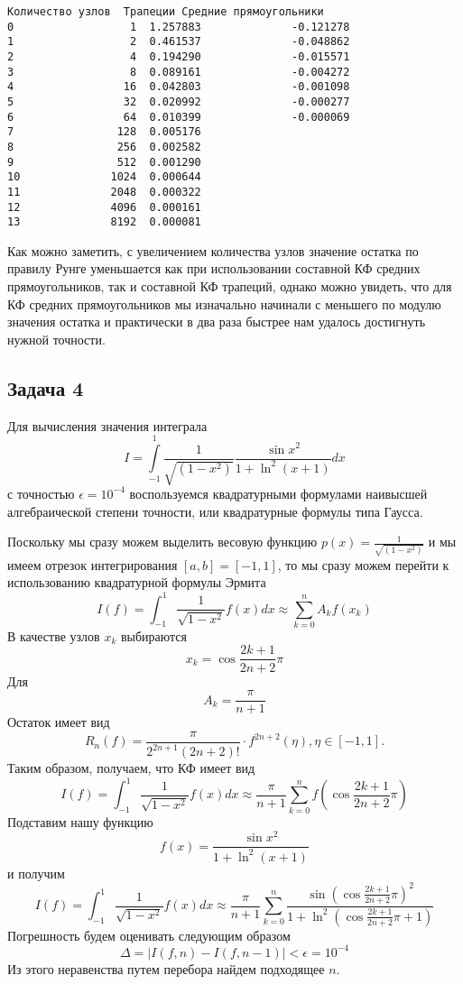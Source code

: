 \documentclass[11pt]{article}
\makeatletter
\newcommand{\boxspacing}{\kern\kvtcb@left@rule\kern\kvtcb@boxsep}
\newcommand{\prompt}[4]{
        {\ttfamily\llap{{\color{#2}[#3]:\hspace{3pt}#4}}\vspace{-\baselineskip}}
    }
\makeatother
\begin{document}
            \begin{tcolorbox}[breakable, size=fbox, boxrule=.5pt, pad at break*=1mm, opacityfill=0]
\prompt{Out}{outcolor}{18}{\boxspacing}
\begin{Verbatim}[commandchars=\\\{\}]
    Количество узлов  Трапеции Средние прямоугольники
0                  1  1.257883              -0.121278
1                  2  0.461537              -0.048862
2                  4  0.194290              -0.015571
3                  8  0.089161              -0.004272
4                 16  0.042803              -0.001098
5                 32  0.020992              -0.000277
6                 64  0.010399              -0.000069
7                128  0.005176
8                256  0.002582
9                512  0.001290
10              1024  0.000644
11              2048  0.000322
12              4096  0.000161
13              8192  0.000081
\end{Verbatim}
\end{tcolorbox}
        
    Как можно заметить, с увеличением количества узлов значение остатка по
правилу Рунге уменьшается как при использовании составной КФ средних
прямоугольников, так и составной КФ трапеций, однако можно увидеть, что
для КФ средних прямоугольников мы изначально начинали с меньшего по
модулю значения остатка и практически в два раза быстрее нам удалось
достигнуть нужной точности.

    \subsection*{Задача 4}

Для вычисления значения интеграла
\[I = \int\limits_{-1}^1 \frac{1}{\sqrt{(1-x^2)}} \dfrac{\sin x^2}{1 + \ln^2(x+1)}dx\]
с точностью \(\epsilon=10^{-4}\) воспользуемся квадратурными формулами
наивысшей алгебраической степени точности, или квадратурные формулы типа
Гаусса.

Поскольку мы сразу можем выделить весовую функцию
\(p(x)=\frac{1}{\sqrt{(1-x^2)}}\) и мы имеем отрезок интегрирования
\([a,b]=[-1,1]\), то мы сразу можем перейти к использованию квадратурной
формулы Эрмита
\[I(f)=\int_{-1}^1 \frac{1}{\sqrt{1-x^2}}f(x)dx \approx \sum_{k=0}^nA_kf(x_k)\]
В качестве узлов \(x_k\) выбираются \[x_k=\cos{\frac{2k+1}{2n+2} \pi}\]
Для \[A_k=\frac{\pi}{n+1}\] Остаток имеет вид
\[R_n(f) = \frac{\pi}{2^{2n+1}(2n+2)!} \cdot f^{2n+2}(\eta), \eta \in [-1,1].\]
Таким образом, получаем, что КФ имеет вид
\[I(f)=\int_{-1}^1 \frac{1}{\sqrt{1-x^2}}f(x)dx \approx \frac{\pi}{n+1}\sum_{k=0}^nf(\cos{\frac{2k+1}{2n+2} \pi})\]
Подставим нашу функцию \[f(x) =  \dfrac{\sin x^2}{1 + \ln^2(x+1)}\] и
получим
\[I(f)=\int_{-1}^1 \frac{1}{\sqrt{1-x^2}}f(x)dx \approx \frac{\pi}{n+1}\sum_{k=0}^n\dfrac{\sin (\cos{\frac{2k+1}{2n+2} \pi})^2}{1 + \ln^2(\cos{\frac{2k+1}{2n+2} \pi}+1)}\]
Погрешность будем оценивать следующим образом
\[\Delta = |I(f,n)-I(f,n-1)| < \epsilon = 10^{-4}\] Из этого неравенства
путем перебора найдем подходящее \(n\).
\end{document}
